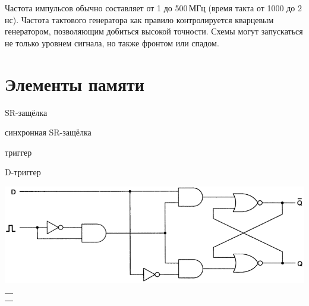 \smallskip
Частота импульсов обычно составляет от 1 до 500\,МГц (время такта от 1000 до 2\,нс). Частота тактового генератора как правило контролируется кварцевым генератором, позволяющим добиться высокой точности. Схемы могут запускаться не только уровнем сигнала, но также фронтом или спадом.



\section{Элементы памяти}
\begin{flushleft}\begin{minipage}[c]{0.3\columnwidth}\newcommand{\vsp}{\vspace{0.5cm}}
    SR-защёлка
    \par\vsp синхронная SR-защёлка
    \par\vsp триггер
    \par\vsp D-триггер
  \end{minipage}\hfill\begin{minipage}[c]{0.65\columnwidth}
    \includegraphics[width=\columnwidth]{images/D-trigger.png}
\end{minipage}\end{flushleft}



\WhatToReadSection
\begin{tabular}{@{}l@{}}
  \citeauthor[глава~2, стр.~144--200, 220--248; глава~5, стр.~601--638]{Harris:2015:ru} \\
  \citeauthor[глава~3, стр.~182--208]{Tanenbaum:2013:ru}
\end{tabular}




